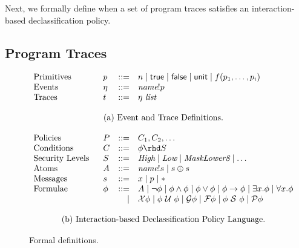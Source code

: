 \documentclass{llncs}
\newcommand{\code}[1]{\textsf{#1}} %
\newcommand{\sfmt}[1]{\textsf{#1}}
\newcommand{\sch}{\textit{name}}
\newcommand{\sfalse}{\sfmt{false}}
\newcommand{\strue}{\sfmt{true}}
\newcommand{\sunit}{\sfmt{unit}}
\newcommand{\xv}{p}
\newcommand{\atom}{A}
\newcommand{\tnext}{\mathcal{X}}
\newcommand{\talways}{\mathcal{G}}
\newcommand{\tfuture}{\mathcal{F}}
\newcommand{\tuntil}{~\mathcal{U}~}
\newcommand{\tsince}{~\mathcal{S}~}
\newcommand{\tpast}{\mathcal{P}}
\newcommand{\limplies}{\rightarrow}
\newcommand{\evt}{\eta}
\begin{document}
Next, we formally define when a set of program traces satisfies an
interaction-based declassification policy.


\subsection{Program Traces}
\label{sec:traces}

\begin{figure}[t!]
  \small
  \centering
  \begin{displaymath}
    \begin{array}{p{1in}lrl}
      Primitives & \xv & ::= & n \mid \strue \mid \sfalse \mid \sunit \mid f(\xv_1, \ldots, \xv_i) \\
      Events & \evt & ::= & \sch ! p \\
      Traces & t & ::= & \evt ~ \textit{list} \\
      \\
      \multicolumn{4}{c}{\textrm{(a) Event and Trace Definitions.}} \\
      \\
      Policies & P & ::= & C_1, C_2, \ldots \\
      Conditions & C & ::= & \phi \rhd S\\
      Security Levels & S & ::= & \textit{High} \mid \textit{Low} \mid
      \textit{MaskLower8} \mid \ldots \\
      Atoms & \atom & ::= & \sch!s \mid s \oplus s \\
      Messages & s & ::= & x \mid p \mid \ast \\
      Formulae & \phi & ::= &
      \atom
      \mid \neg \phi
      \mid \phi \wedge \phi
      \mid \phi \vee \phi
      \mid \phi \limplies \phi
      \mid \exists x.\phi 
      \mid \forall x.\phi \\
      && \mid  & \tnext \phi
      \mid \phi \tuntil \phi
      \mid \talways \phi
      \mid \tfuture \phi
      \mid \phi \tsince \phi
      \mid \tpast \phi \\
      \\
      \multicolumn{4}{c}{\textrm{(b) Interaction-based Declassification Policy Language.}}
    \end{array}
  \end{displaymath}
  \caption{Formal definitions.}
  \label{fig:formalism}
\end{figure}
\end{document}

